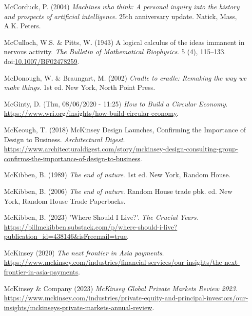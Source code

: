 \documentclass[
  letterpaper,
  DIV=11,
  numbers=noendperiod]{scrartcl}
\newlength{\cslhangindent}
\newenvironment{CSLReferences}[2] %
 {\begin{list}{}{%
  \setlength{\itemindent}{0pt}
  \setlength{\leftmargin}{0pt}
  \setlength{\parsep}{0pt}
  \ifodd #1
   \setlength{\leftmargin}{\cslhangindent}
   \setlength{\itemindent}{-1\cslhangindent}
  \fi
  \setlength{\itemsep}{#2\baselineskip}}}
 {\end{list}}
\begin{document}
\begin{CSLReferences}{0}{1}
McCorduck, P. (2004) \emph{Machines who think: A personal inquiry into
the history and prospects of artificial intelligence}. 25th anniversary
update. Natick, Mass, A.K. Peters.

McCulloch, W.S. \& Pitts, W. (1943) A logical calculus of the ideas
immanent in nervous activity. \emph{The Bulletin of Mathematical
Biophysics}. 5 (4), 115--133.
doi:\href{https://doi.org/10.1007/BF02478259}{10.1007/BF02478259}.

McDonough, W. \& Braungart, M. (2002) \emph{Cradle to cradle: Remaking
the way we make things}. 1st ed. New York, North Point Press.

McGinty, D. (Thu, 08/06/2020 - 11:25) \emph{How to {Build} a {Circular
Economy}}.
\url{https://www.wri.org/insights/how-build-circular-economy}.

McKeough, T. (2018) {McKinsey Design Launches}, {Confirming} the
{Importance} of {Design} to {Business}. \emph{Architectural Digest}.
\url{https://www.architecturaldigest.com/story/mckinsey-design-consulting-group-confirms-the-importance-of-design-to-business}.

McKibben, B. (1989) \emph{The end of nature}. 1st ed. New York, Random
House.

McKibben, B. (2006) \emph{The end of nature}. Random House trade pbk.
ed. New York, Random House Trade Paperbacks.

McKibben, B. (2023) '{Where Should I Live}?'. \emph{The Crucial Years}.
\url{https://billmckibben.substack.com/p/where-should-i-live?publication_id=438146&isFreemail=true}.

McKinsey (2020) \emph{The next frontier in {Asia} payments}.
\url{https://www.mckinsey.com/industries/financial-services/our-insights/the-next-frontier-in-asia-payments}.

McKinsey \& Company (2023) \emph{{McKinsey Global Private Markets
Review} 2023}.
\url{https://www.mckinsey.com/industries/private-equity-and-principal-investors/our-insights/mckinseys-private-markets-annual-review}.


\end{CSLReferences}
\end{document}
